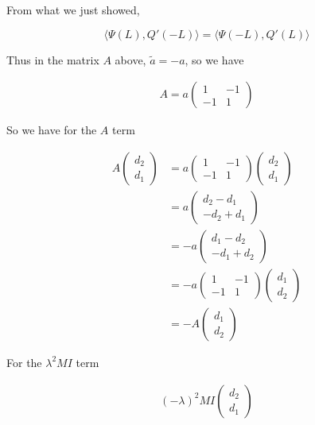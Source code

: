 \documentclass[12pt]{article}
\begin{document}
From what we just showed,

\[
\langle \Psi(L), Q'(-L) \rangle = \langle \Psi(-L), Q'(L) \rangle
\]

Thus in the matrix $A$ above, $\tilde{a} = -a$, so we have

\begin{align*}
A = a \begin{pmatrix}
1 & -1 \\ -1 & 1 
\end{pmatrix}
\end{align*}

So we have for the $A$ term

\begin{align*}
A \begin{pmatrix}d_2\\d_1\end{pmatrix} &= 
a \begin{pmatrix}1 & -1 \\ -1 & 1 \end{pmatrix}\begin{pmatrix}d_2\\d_1\end{pmatrix} \\
&= a\begin{pmatrix}d_2 - d_1 \\ -d_2 + d_1 \end{pmatrix}\\
&= -a\begin{pmatrix}d_1 - d_2 \\ -d_1 + d_2 \end{pmatrix}\\
&= -a\begin{pmatrix}1 & -1 \\ -1 & 1 \end{pmatrix}\begin{pmatrix}d_1\\d_2\end{pmatrix} \\
&= -A \begin{pmatrix}d_1\\d_2\end{pmatrix}
\end{align*}

For the $\lambda^2 M I$ term

\begin{align*}
(-\lambda)^2 M I \begin{pmatrix}d_2\\d_1\end{pmatrix}
\end{align*}
\end{document}
